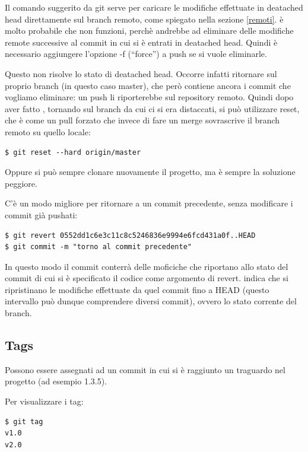 \documentclass{article} \usepackage[textwidth=18cm,textheight=18cm]{geometry}
\begin{document}
Il comando suggerito da git serve per caricare le modifiche effettuate in deatached head
direttamente sul branch remoto, come spiegato nella sezione \ref{remoti}.
è molto probabile che non funzioni, perchè andrebbe ad
eliminare delle modifiche remote successive al commit in
cui si è entrati in deatached head. Quindi è necessario aggiungere l'opzione -f
(``force'') a push se si vuole eliminarle.

Questo non risolve lo stato di deatached head.
Occorre infatti ritornare sul proprio branch (in questo caso master),
che però contiene ancora i commit che vogliamo eliminare: un push li riporterebbe sul 
repository remoto.
Quindi dopo aver fatto , tornando sul branch da cui ci
si era distaccati, si può utilizzare reset, che è come un pull forzato che invece
di fare un merge sovrascrive il branch remoto su quello locale:

\begin{verbatim}
$ git reset --hard origin/master
\end{verbatim}

Oppure si può sempre clonare nuovamente il progetto, ma è sempre la soluzione
peggiore.

C'è un modo migliore per ritornare a un commit precedente, senza modificare i
commit già pushati:

\begin{verbatim}
$ git revert 0552dd1c6e3c11c8c5246836e9994e6fcd431a0f..HEAD
$ git commit -m "torno al commit precedente"
\end{verbatim}

In questo modo il commit  conterrà delle
moficiche che riportano allo stato del commit di cui si è specificato il codice
come argomento di revert.  indica che si ripristinano le modifiche
effettuate da quel commit fino a HEAD (questo intervallo può dunque comprendere
diversi commit), ovvero lo stato corrente del branch.

\subsection{Tags}

Possono essere assegnati ad un commit in cui si è raggiunto un traguardo nel
progetto (ad esempio 1.3.5).

Per visualizzare i tag:

\begin{verbatim}
$ git tag
v1.0
v2.0
\end{verbatim}
\end{document}
